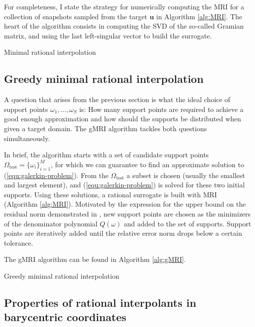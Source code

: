 \documentclass[11pt, a4paper]{article}
\begin{document}
For completeness, I state the strategy for numerically computing the \acrfull{MRI} 
for a collection of snapshots sampled from the target $\mathbf{u}$ \citep{greedyMRI}
in Algorithm \ref{alg:MRI}. The heart of the algorithm consists in computing the
\acrfull{SVD} of the so-called Gramian matrix, and using the last
left-singular vector to build the surrogate.

\begin{algorithm}
    \caption{Minimal rational interpolation} \label{alg:MRI}
    
\end{algorithm}

\subsection{Greedy minimal rational interpolation}
\label{subsec:gMRI}

A question that arises from the previous section is what the ideal choice of
support points $\omega_1, \dots, \omega_S$ is: How many support points are
required to achieve a good enough approximation and how should the supports
be distributed when given a target domain. The \acrfull{gMRI} algorithm 
\citep{shortMRI} tackles both questions simultaneously.

In brief, the algorithm starts with a set of candidate support points
$\Omega_{\mathrm{test}} = \{\omega_i\}_{i=1}^M$, for which we can guarantee
to find an approximate solution to (\ref{equ:galerkin-problem}). 
From the $\Omega_{\mathrm{test}}$ a subset is chosen (usually the smallest and
largest element), and (\ref{equ:galerkin-problem}) is solved for these two initial
supports. Using these solutions, a rational surrogate is built with
\acrshort{MRI} (Algorithm \ref{alg:MRI}). Motivated by the expression for the
upper bound on the residual norm demonstrated in \cite{theoryMRI}, new support
points are chosen as the minimizers of the denominator polynomial $Q(\omega)$
and added to the set of supports. Support points are iteratively added until
the relative error norm drops below a certain tolerance.

The \acrshort{gMRI} algorithm can be found in Algorithm \ref{alg:gMRI}.

\begin{algorithm}
    \caption{Greedy minimal rational interpolation} \label{alg:gMRI}
    
\end{algorithm}

\subsection{Properties of rational interpolants in barycentric coordinates}
\label{subsec:properties}
\end{document}

